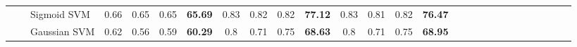 \documentclass[sn-mathphys]{sn-jnl}%
\theoremstyle{thmstyleone}%
\theoremstyle{thmstyletwo}%
\theoremstyle{thmstylethree}%
\begin{document}
\begin{table*}[hbt!]
{\begin{tabular}{lllcccccccccccccccccccccccc}
\multicolumn{1}{|l|}{}                                  & \multicolumn{1}{l|}{}                                                                                        & \multicolumn{1}{l|}{Sigmoid SVM}                          & \multicolumn{1}{c|}{0.66}               & \multicolumn{1}{c|}{0.65}            & \multicolumn{1}{c|}{0.65}              & \multicolumn{1}{c|}{\textbf{65.69}}                                                   & \multicolumn{1}{c|}{0.83}               & \multicolumn{1}{c|}{0.82}            & \multicolumn{1}{c|}{0.82}              & \multicolumn{1}{c|}{\textbf{77.12}}                                                   & \multicolumn{1}{c|}{0.83}               & \multicolumn{1}{c|}{0.81}            & \multicolumn{1}{c|}{0.82}              & \multicolumn{1}{c|}{\textbf{76.47}}                                                   &                      &                      &                      &                      &                      &                      &                      &                      &                      &                      &                      &                      \\ \cline{3-15}
\multicolumn{1}{|l|}{}                                  & \multicolumn{1}{l|}{}                                                                                        & \multicolumn{1}{l|}{Gaussian SVM}                         & \multicolumn{1}{c|}{0.62}               & \multicolumn{1}{c|}{0.56}            & \multicolumn{1}{c|}{0.59}              & \multicolumn{1}{c|}{\textbf{60.29}}                                                   & \multicolumn{1}{c|}{0.8}                & \multicolumn{1}{c|}{0.71}            & \multicolumn{1}{c|}{0.75}              & \multicolumn{1}{c|}{\textbf{68.63}}                                                   & \multicolumn{1}{c|}{0.8}                & \multicolumn{1}{c|}{0.71}            & \multicolumn{1}{c|}{0.75}              & \multicolumn{1}{c|}{\textbf{68.95}}                                                   &                      &                      &                      &                      &                      &                      &                      &                      &                      &                      &                      &                      \\ \cline{3-15}

\end{tabular}}
\end{table*}
\end{document}
